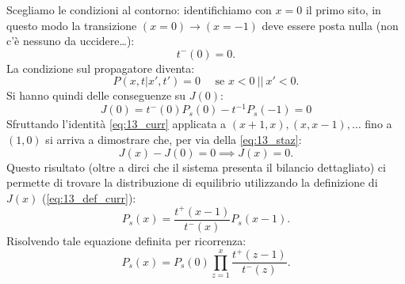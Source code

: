 Scegliamo le condizioni al contorno: identifichiamo con $x=0$ il primo sito, in questo modo la transizione $(x=0)\to (x=-1) $ deve essere posta nulla (non c'è nessuno da uccidere\ldots):
\[
    t^-(0) = 0
.\] 
La condizione sul propagatore diventa:
\[
    P\left(x,t|x',t'\right) = 0 \quad \text{ se } x < 0 \ || \ x' < 0
.\] 
Si hanno quindi delle conseguenze su $J(0)$:
\begin{equation}
    J(0) = t^-(0) P_s(0) - t^{-1}P_s(-1) = 0 \label{eq:13_staz}
\end{equation}
Sfruttando l'identità \ref{eq:13_curr} applicata a $(x+1,x),(x,x-1),\ldots$ fino a $(1,0)$ si arriva a dimostrare che, per via della \ref{eq:13_staz}:
\[
    J(x) - J(0) = 0 \implies  J(x) = 0
.\] 
Questo risultato (oltre a dirci che il sistema presenta il bilancio dettagliato) ci permette di trovare la distribuzione di equilibrio utilizzando la definizione di $J(x)$ (\ref{eq:13_def_curr}): 
\[
    P_s(x) = \frac{t^+(x-1)}{t^-(x)}P_s(x-1) 
.\] 
Risolvendo tale equazione definita per ricorrenza:
\[
    P_s(x) = P_s(0) \prod_{z=1}^{x} \frac{t^+(z-1)}{t^-(z)} 
.\] 
